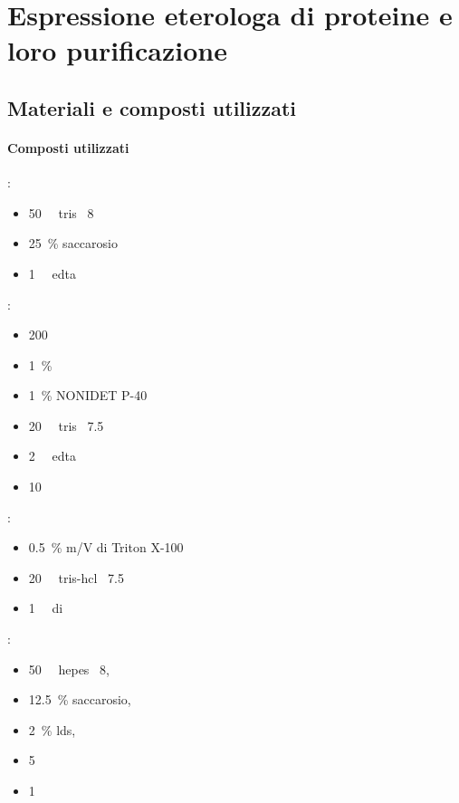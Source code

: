 \section{Espressione eterologa di proteine e loro purificazione}\label{sec:espProteine}

\subsection{Materiali e composti utilizzati}


\paragraph{Composti utilizzati}
\begin{itemize}
	\begin{multicols}{2}
		:
		\begin{itemize}[squareItem]
			\item \qty{50}{\milli\Molar} \gls{tris} \pH\ 8
			\item \qty{25}{\percent} saccarosio
			\item \qty{1}{\milli\Molar} \gls{edta}
		\end{itemize}
		:
		\begin{itemize}[squareItem]
			\item \qty{200}{\milli\Molar} 
			\item \qty{1}{\percent} 
			\item \qty{1}{\percent} NONIDET P-40
			\item \qty{20}{\milli\Molar} \gls{tris} \pH\ \num{7.5}
			\item \qty{2}{\milli\Molar} \gls{edta}
			\item \qty{10}{\milli\Molar} 
		\end{itemize}
		:
		\begin{itemize}[squareItem]
			\item \qty{0.5}{\percent} m/V di Triton X-100
			\item \qty{20}{\milli\Molar} \gls{tris-hcl} \pH\ \num{7.5}
			\item \qty{1}{\milli\Molar} di 
		\end{itemize}
		:
		\begin{itemize}[squareItem]
			\item \qty{50}{\milli\Molar} \gls{hepes} \pH\ 8,
			\item \qty{12.5}{\percent} saccarosio,
			\item \qty{2}{\percent} \gls{lds},
			\item \qty{5}{\milli\Molar} 
			\item \qty{1}{\milli\Molar} 
		\end{itemize}
	\end{multicols}
\end{itemize}

